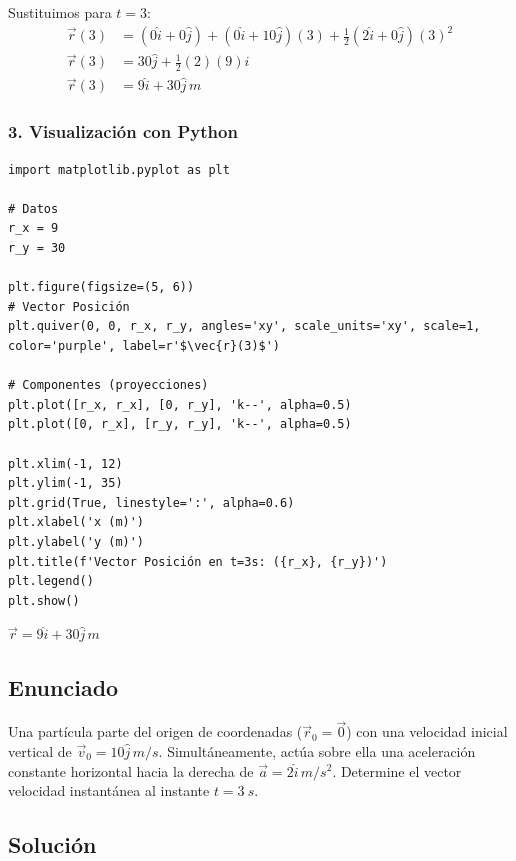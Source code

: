 \documentclass[12pt, a4paper]{article}
\begin{document}
Sustituimos para $t=3$:
\begin{align*}
    \vec{r}(3) &= (0\hat{i} + 0\hat{j}) + (0\hat{i} + 10\hat{j})(3) + \frac{1}{2}(2\hat{i} + 0\hat{j})(3)^2 \\
    \vec{r}(3) &= 30\hat{j} + \frac{1}{2}(2)(9)\hat{i} \\
    \vec{r}(3) &= 9\hat{i} + 30\hat{j} \, \si{m}
\end{align*}

\subsubsection*{3. Visualización con Python}
\begin{verbatim}
import matplotlib.pyplot as plt

# Datos
r_x = 9
r_y = 30

plt.figure(figsize=(5, 6))
# Vector Posición
plt.quiver(0, 0, r_x, r_y, angles='xy', scale_units='xy', scale=1, color='purple', label=r'$\vec{r}(3)$')

# Componentes (proyecciones)
plt.plot([r_x, r_x], [0, r_y], 'k--', alpha=0.5)
plt.plot([0, r_x], [r_y, r_y], 'k--', alpha=0.5)

plt.xlim(-1, 12)
plt.ylim(-1, 35)
plt.grid(True, linestyle=':', alpha=0.6)
plt.xlabel('x (m)')
plt.ylabel('y (m)')
plt.title(f'Vector Posición en t=3s: ({r_x}, {r_y})')
plt.legend()
plt.show()
\end{verbatim}

\begin{tcolorbox}[colback=blue!5!white, colframe=blue!75!black, title=Respuesta Final]
\centering \Large $\vec{r} = 9\hat{i} + 30\hat{j} \, \si{m}$
\end{tcolorbox}

\newpage

\subsection*{Enunciado}
Una partícula parte del origen de coordenadas ($\vec{r}_0 = \vec{0}$) con una velocidad inicial vertical de $\vec{v}_0 = 10\hat{j} \, \si{m/s}$. Simultáneamente, actúa sobre ella una aceleración constante horizontal hacia la derecha de $\vec{a} = 2\hat{i} \, \si{m/s^2}$. Determine el vector velocidad instantánea al instante $t = \SI{3}{s}$.


\subsection*{Solución}
\end{document}
